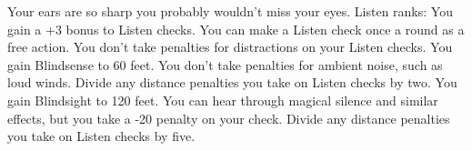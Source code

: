 \skillfeat
{Your ears are so sharp you probably wouldn't miss your eyes.}
{Listen ranks:}
{You gain a +3 bonus to Listen checks.}
{You can make a Listen check once a round as a free action. You don't take penalties for distractions on your Listen checks.}
{You gain Blindsense to 60 feet. You don't take penalties for ambient noise, such as loud winds. Divide any distance penalties you take on Listen checks by two.}
{You gain Blindsight to 120 feet.}
{You can hear through magical silence and similar effects, but you take a -20 penalty on your check. Divide any distance penalties you take on Listen checks by five.}